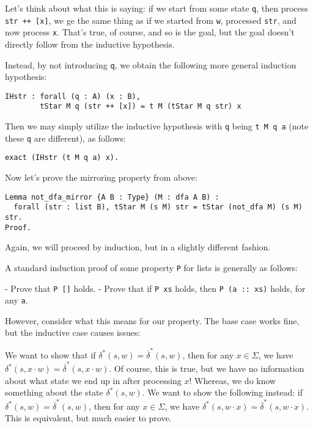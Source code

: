 Let's think about what this is saying: if we start from some state \texttt{q}, then process \texttt{str ++ [x]}, we ge the same thing as if we started from \texttt{w}, processed \texttt{str}, and now process \texttt{x}.
That's true, of course, and so is the goal, but the goal doesn't directly follow from the inductive hypothesis.

Instead, by not introducing \texttt{q}, we obtain the following more general induction hypothesis:

\begin{verbatim}
IHstr : forall (q : A) (x : B),
        tStar M q (str ++ [x]) = t M (tStar M q str) x
\end{verbatim}

Then we may simply utilize the inductive hypothesis with \texttt{q} being \texttt{t M q a} (note these \texttt{q} are different), as follows:

\begin{verbatim}
exact (IHstr (t M q a) x).
\end{verbatim}

Now let's prove the mirroring property from above:

\begin{verbatim}
Lemma not_dfa_mirror {A B : Type} (M : dfa A B) :
  forall (str : list B), tStar M (s M) str = tStar (not_dfa M) (s M) str.
Proof.
\end{verbatim}

Again, we will proceed by induction, but in a slightly different fashion.

A standard induction proof of some property \texttt{P} for lists is generally as follows:

- Prove that \texttt{P []} holds.
- Prove that if \texttt{P xs} holds, then \texttt{P (a :: xs)} holds, for any \texttt{a}.

However, consider what this means for our property.
The base case works fine, but the inductive case causes issues:

We want to show that if $\delta^*(s, w) = \overline{\delta}^*(s, w)$, then for any $x \in \Sigma$, we have $\delta^*(s, x \cdot w) = \overline{\delta}^*(s, x \cdot w)$.
Of course, this is true, but we have no information about what state we end up in after processing $x$!
Whereas, we do know something about the state $\delta^*(s, w)$.
We want to show the following instead: if $\delta^*(s, w) = \overline{\delta}^*(s, w)$, then for any $x \in \Sigma$, we have $\delta^*(s, w \cdot x) = \overline{\delta}^*(s, w \cdot x)$.
This is equivalent, but much easier to prove.

